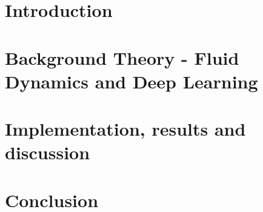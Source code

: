 
\addtolength{\evensidemargin}{-12mm}

%
%
\part[Introduction]{Introduction}
\label{part:Intro}


\part[Theory]{Background Theory - Fluid Dynamics and Deep Learning}
\label{part:Theory}


\part[Methodology]{Implementation, results and discussion}
\label{part:Method}



% 
\part[Conclusion]{Conclusion}
\label{part:Conclusion}

%
%


% 
